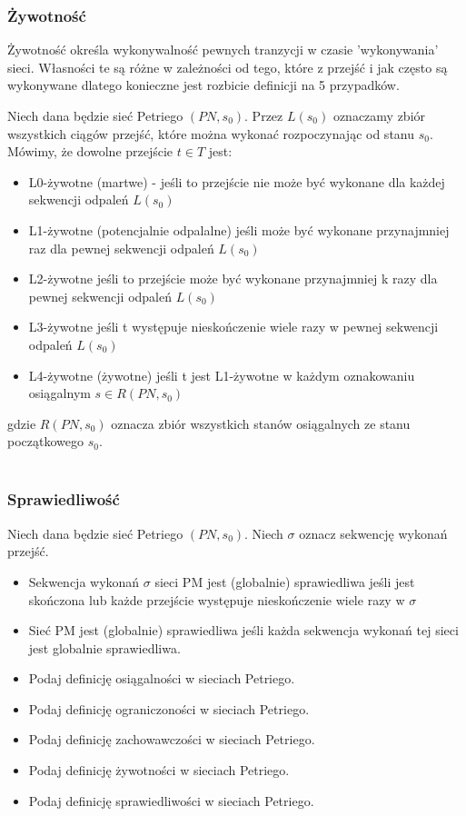 \documentclass[a4paper,15pt]{article}
\newcommand{\definition}[2]{
    \begin{tcolorbox}[colback=green!5!white,colframe=mGreen,title={Definicja -  #1}]
        #2
    \end{tcolorbox}
}
\begin{document}
\subsubsection{Żywotność}
Żywotność określa wykonywalność pewnych tranzycji w czasie 'wykonywania' sieci. Własności te są różne w zależności od tego, które z przejść i jak często są wykonywane dlatego konieczne jest rozbicie definicji na 5 przypadków.
\definition{Żywotność}{
Niech dana będzie sieć Petriego $(PN, s_0)$. Przez $L(s_0)$ oznaczamy zbiór wszystkich ciągów przejść, które można wykonać rozpoczynając od stanu $s_0$. \\
Mówimy, że dowolne przejście $t \in T$ jest:
\begin{itemize}
\item L0-żywotne (martwe) -  jeśli to przejście nie może być wykonane dla każdej sekwencji odpaleń $L(s_0)$
\item L1-żywotne (potencjalnie odpalalne) jeśli może być wykonane przynajmniej raz dla pewnej sekwencji odpaleń $L(s_0)$
\item L2-żywotne jeśli to przejście może być wykonane przynajmniej  k razy  dla pewnej sekwencji odpaleń $L(s_0)$
\item L3-żywotne jeśli t występuje nieskończenie wiele razy w pewnej sekwencji odpaleń $L(s_0)$
\item L4-żywotne (żywotne) jeśli t jest L1-żywotne w każdym oznakowaniu osiągalnym  $s \in R(PN, s_0)$
\end{itemize}
gdzie $R(PN,s_0)$ oznacza zbiór wszystkich stanów osiągalnych ze stanu początkowego $s_0$. \\ \\
}

\subsubsection{Sprawiedliwość}
\definition{Sprawiedliwość}{
Niech dana będzie sieć Petriego $(PN, s_0)$. Niech $\sigma$ oznacz sekwencję wykonań przejść.
\begin{itemize}
\item Sekwencja wykonań $\sigma$ sieci PM jest (globalnie) sprawiedliwa jeśli jest skończona lub każde przejście występuje nieskończenie wiele razy w $\sigma$
\item Sieć PM jest (globalnie) sprawiedliwa jeśli każda sekwencja wykonań tej sieci jest globalnie sprawiedliwa.
\end{itemize}
}


\begin{framed}
\begin{itemize}
\item Podaj definicję osiągalności w sieciach Petriego.
\item Podaj definicję ograniczoności w sieciach Petriego.
\item Podaj definicję zachowawczości w sieciach Petriego.
\item Podaj definicję żywotności w sieciach Petriego.
\item Podaj definicję sprawiedliwości w sieciach Petriego.
\end{itemize}
\end{framed}
\end{document}
